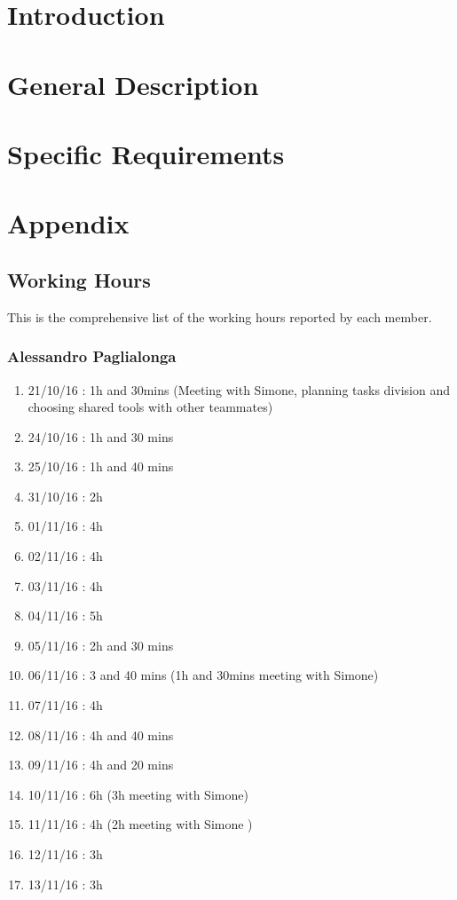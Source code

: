 \maketitle
\clearpage
\tableofcontents

\clearpage
\section{Introduction} \label{Intro}


\clearpage
\section{General Description} \label{Description}


\clearpage
\section{Specific Requirements} \label {Requirements}


\clearpage
\section{Appendix}


\clearpage
\subsection{Working Hours}
This is the comprehensive list of the working hours reported by each member.

\subsubsection{Alessandro Paglialonga}
\begin{enumerate}
\item21/10/16 : 1h and 30mins (Meeting with Simone, planning tasks division and choosing shared tools with other teammates)
\item24/10/16 : 1h and 30 mins 
\item25/10/16 : 1h and 40 mins
\item31/10/16 : 2h 
\item01/11/16 : 4h
\item02/11/16 : 4h
\item03/11/16 : 4h
\item04/11/16 : 5h
\item05/11/16 : 2h and 30 mins
\item06/11/16 : 3 and 40 mins (1h and 30mins meeting with Simone)
\item07/11/16 : 4h
\item08/11/16 : 4h and 40 mins
\item09/11/16 : 4h and 20 mins
\item10/11/16 : 6h (3h meeting with Simone)
\item11/11/16 : 4h (2h meeting with Simone )
\item12/11/16 : 3h
\item13/11/16 : 3h
\end{enumerate}

